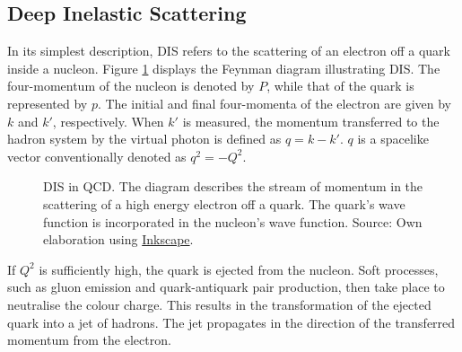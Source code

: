 \subsection{Deep Inelastic Scattering}
\label{ssec::deep_inelastic_scattering}
    In its simplest description, DIS refers to the scattering of an electron off a quark inside a nucleon.
    Figure \ref{fig::dis_diagram} displays the Feynman diagram illustrating DIS.
    The four-momentum of the nucleon is denoted by $P$, while that of the quark is represented by $p$.
    The initial and final four-momenta of the electron are given by $k$ and $k'$, respectively.
    When $k'$ is measured, the momentum transferred to the hadron system by the virtual photon is defined as $q = k - k'$.
    $q$ is a spacelike vector conventionally denoted as $q^2 = -Q^2$.

    \begin{figure}[h!]
        \centering{}
        \caption[DIS in QCD.]{DIS in QCD. The diagram describes the stream of momentum in the scattering of a high energy electron off a quark. The quark's wave function is incorporated in the nucleon's wave function. Source: Own elaboration using \hyperlink{inkscape.org/}{Inkscape}.}
        \label{fig::dis_diagram}
    \end{figure}

    If $Q^2$ is sufficiently high, the quark is ejected from the nucleon.
    Soft processes, such as gluon emission and quark-antiquark pair production, then take place to neutralise the colour charge.
    This results in the transformation of the ejected quark into a jet of hadrons.
    The jet propagates in the direction of the transferred momentum from the electron.

    
    
    
